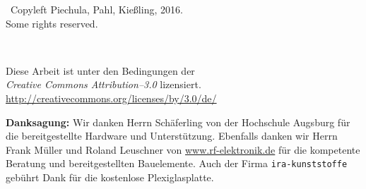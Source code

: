 \newpage

\thispagestyle{empty}
\vspace*{0in}
\begin{center}
  {\Large{}}\ Copyleft Piechula, Pahl, Kießling, 2016. \\
  Some rights reserved. \\
  \vspace{1in}
  \begin{minipage}[c]{0.2\linewidth}
    \hfill {\Huge \ccLogo~\ccAttribution}
  \end{minipage}
  \hspace{0.1cm}
  \begin{minipage}[c]{0.7\linewidth}
    Diese Arbeit ist unter den Bedingungen der \\
    \textit{Creative Commons Attribution--3.0} lizensiert. \\
    \url{http://creativecommons.org/licenses/by/3.0/de/}
  \end{minipage}
\end{center}
\vspace{6cm}
\textbf{Danksagung:} Wir danken Herrn Schäferling von der Hochschule Augsburg für die bereitgestellte Hardware und Unterstützung.
Ebenfalls danken wir Herrn Frank Müller und Roland Leuschner von \url{www.rf-elektronik.de} für die kompetente Beratung und bereitgestellten Bauelemente.
Auch der Firma \texttt{ira-kunststoffe} gebührt Dank für die kostenlose Plexiglasplatte.
\clearpage 

\newpage
